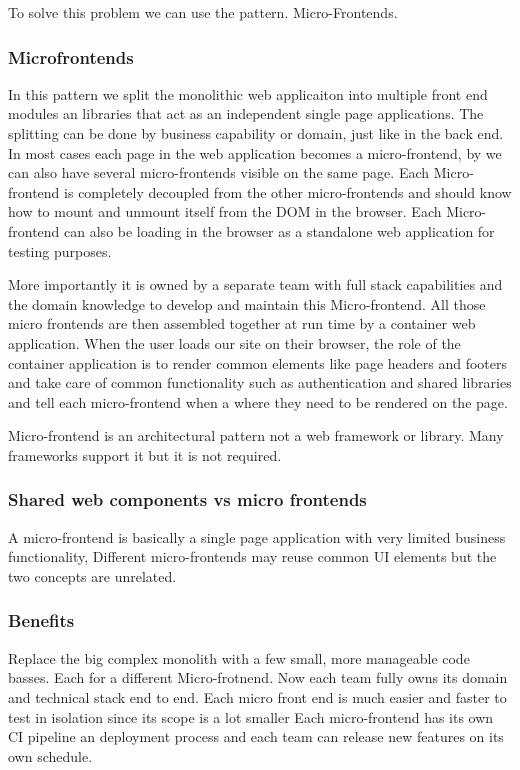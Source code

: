 To solve this problem we can use the pattern.
Micro-Frontends.

\subsubsection{Microfrontends}
In this pattern we split the monolithic web applicaiton into multiple front end modules an libraries that act as an independent single page applications.
The splitting can be done by business capability or domain, just like in the back end.
In most cases each page in the web application becomes a micro-frontend, by we can also have several micro-frontends visible on the same page.
Each Micro-frontend is completely decoupled from the other micro-frontends and should know how to mount and unmount itself from the DOM in the browser.
Each Micro-frontend can also be loading in the browser as a standalone web application for testing purposes.

More importantly it is owned by a separate team with full stack capabilities and the domain knowledge to develop and maintain this Micro-frontend.
All those micro frontends are then assembled together at run time by a container web application.
When the user loads our site on their browser, the role of the container application is to render common elements like page headers and footers and take care of common functionality such as authentication and shared libraries and tell each micro-frontend when a where they need to be rendered on the page.

Micro-frontend is an architectural pattern not a web framework or library.
Many frameworks support it but it is not required.

\subsubsection{Shared web components vs micro frontends}
A micro-frontend is basically a single page application with very limited business functionality,
Different micro-frontends may reuse common UI elements but the two concepts are unrelated.

\subsubsection{Benefits}
Replace the big complex monolith with a few small, more manageable code basses.
Each for a different Micro-frotnend.
Now each team fully owns its domain and technical stack end to end.
Each micro front end is much easier and faster to test in isolation since its scope is a lot smaller
Each micro-frontend has its own CI pipeline an deployment process and each team can release new features on its own schedule.

